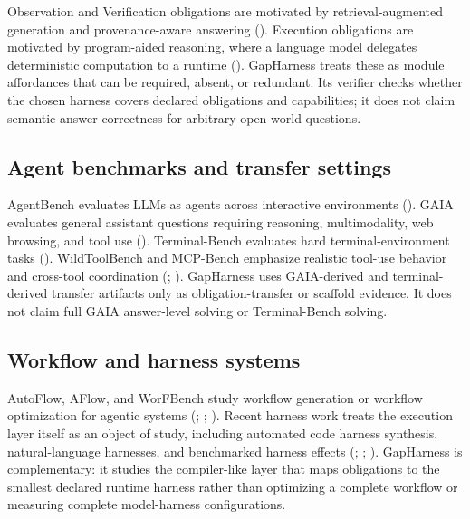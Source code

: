 \documentclass[
  10pt,
]{article}
\begin{document}
Observation and Verification obligations are motivated by
retrieval-augmented generation and provenance-aware answering
(). Execution obligations
are motivated by program-aided reasoning, where a language model
delegates deterministic computation to a runtime
(). GapHarness treats these as
module affordances that can be required, absent, or redundant. Its
verifier checks whether the chosen harness covers declared obligations
and capabilities; it does not claim semantic answer correctness for
arbitrary open-world questions.

\subsection{Agent benchmarks and transfer
settings}\label{agent-benchmarks-and-transfer-settings}

AgentBench evaluates LLMs as agents across interactive environments
(). GAIA evaluates
general assistant questions requiring reasoning, multimodality, web
browsing, and tool use (). Terminal-Bench evaluates hard terminal-environment tasks
().
WildToolBench and MCP-Bench emphasize realistic tool-use behavior and
cross-tool coordination (; ). GapHarness
uses GAIA-derived and terminal-derived transfer artifacts only as
obligation-transfer or scaffold evidence. It does not claim full GAIA
answer-level solving or Terminal-Bench solving.

\subsection{Workflow and harness
systems}\label{workflow-and-harness-systems}

AutoFlow, AFlow, and WorFBench study workflow generation or workflow
optimization for agentic systems (; ;
). Recent harness work
treats the execution layer itself as an object of study, including
automated code harness synthesis, natural-language harnesses, and
benchmarked harness effects (; ;
). GapHarness is
complementary: it studies the compiler-like layer that maps obligations
to the smallest declared runtime harness rather than optimizing a
complete workflow or measuring complete model-harness configurations.
\end{document}
